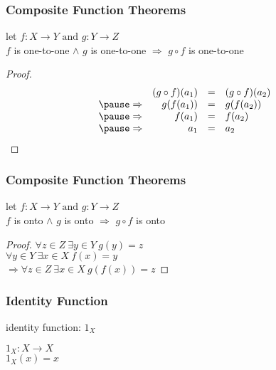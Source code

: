 \documentclass[dvipsnames]{beamer}
\begin{document}
\begin{frame}
  \frametitle{Composite Function Theorems}

  \begin{theorem}
    let $f: X \rightarrow Y \mbox{  and   } g: Y \rightarrow Z$\\
    $f$ is one-to-one $\wedge$ $g$ is one-to-one
      $\Rightarrow$ $g \circ f$ is one-to-one
  \end{theorem}

  \pause
  \begin{proof}
    \[
      \begin{array}{crcl}
                  & (g \circ f) (a_1) & = & (g \circ f) (a_2)\\\pause
      \Rightarrow & g(f(a_1))         & = & g(f(a_2))\\\pause
      \Rightarrow & f(a_1)            & = & f(a_2)\\\pause
      \Rightarrow & a_1               & = & a_2
      \end{array}
    \]
  \end{proof}
\end{frame}

\begin{frame}
  \frametitle{Composite Function Theorems}

  \begin{theorem}
    let $f: X \rightarrow Y \mbox{  and   } g: Y \rightarrow Z$\\
    $f$ is onto $\wedge$ $g$ is onto $\Rightarrow$ $g \circ f$ is onto
  \end{theorem}

  \pause
  \begin{proof}
    $\forall z \in Z~\exists y \in Y~g(y) = z$\\\pause
    $\forall y \in Y~\exists x \in X~f(x) = y$\\\pause
      $\Rightarrow \forall z \in Z~\exists x \in X~g(f(x)) = z$
  \end{proof}
\end{frame}

\begin{frame}
  \frametitle{Identity Function}

  \begin{definition}
    \alert{identity function}: $1_X$

    \medskip
    $1_X: X \rightarrow X$\\
    $1_X(x) = x$
  \end{definition}
\end{frame}
\end{document}
